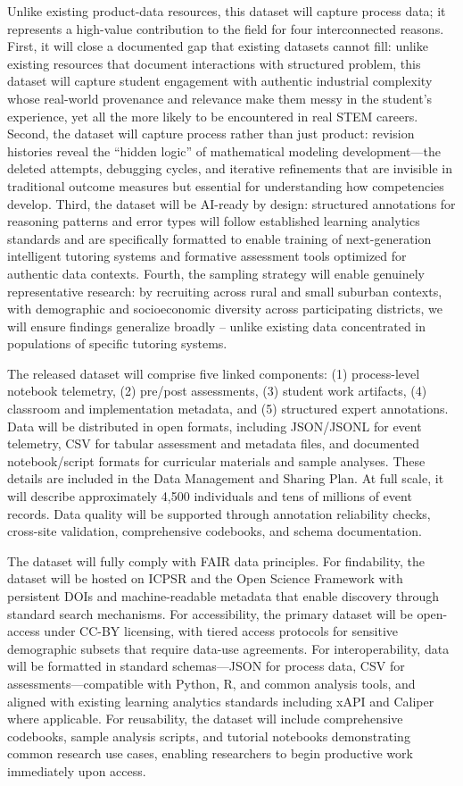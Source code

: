 \documentclass[11pt]{article}
\begin{document}
Unlike existing product-data resources, this dataset will capture process data; it represents a high-value contribution to the field for four interconnected reasons.
First, it will close a documented gap that existing datasets cannot fill: unlike existing resources that document interactions with structured problem, this dataset will capture student engagement with authentic industrial complexity whose real-world provenance and relevance make them messy in the student's experience, yet all the more likely to be encountered in real STEM careers. 
Second, the dataset will capture process rather than just product: revision histories reveal the ``hidden logic'' of mathematical modeling development—the deleted attempts, debugging cycles, and iterative refinements that are invisible in traditional outcome measures but essential for understanding how competencies develop.
Third, the dataset will be AI-ready by design: structured annotations for reasoning patterns and error types will follow established learning analytics standards and are specifically formatted to enable training of next-generation intelligent tutoring systems and formative assessment tools optimized for authentic data contexts.
Fourth, the sampling strategy will enable genuinely representative research: by recruiting across rural and small suburban contexts, with demographic and socioeconomic diversity across participating districts, we will ensure findings generalize broadly -- unlike existing data concentrated in populations of specific tutoring systems.

The released dataset will comprise five linked components: (1) process-level notebook telemetry, (2) pre/post assessments, (3) student work artifacts, (4) classroom and implementation metadata, and (5) structured expert annotations. 
Data will be distributed in open formats, including JSON/JSONL for event telemetry, CSV for tabular assessment and metadata files, and documented notebook/script formats for curricular materials and sample analyses.
These details are included in the Data Management and Sharing Plan.
At full scale, it will describe approximately 4,500 individuals and tens of millions of event records.
Data quality will be supported through annotation reliability checks, cross-site validation, comprehensive codebooks, and schema documentation.

The dataset will fully comply with FAIR data principles. 
For findability, the dataset will be hosted on ICPSR and the Open Science Framework with persistent DOIs and machine-readable metadata that enable discovery through standard search mechanisms. 
For accessibility, the primary dataset will be open-access under CC-BY licensing, with tiered access protocols for sensitive demographic subsets that require data-use agreements.
For interoperability, data will be formatted in standard schemas—JSON for process data, CSV for assessments—compatible with Python, R, and common analysis tools, and aligned with existing learning analytics standards including xAPI and Caliper where applicable.
For reusability, the dataset will include comprehensive codebooks, sample analysis scripts, and tutorial notebooks demonstrating common research use cases, enabling researchers to begin productive work immediately upon access.
\end{document}
